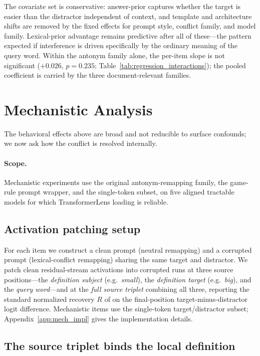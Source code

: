 \documentclass[11pt]{article}
\begin{document}
The covariate set is conservative: answer-prior captures whether the target is easier than the
distractor independent of context, and template and architecture shifts are removed by the
fixed effects for prompt style, conflict family, and model family. Lexical-prior advantage remains predictive after all of these---the pattern expected if
interference is driven specifically by the ordinary meaning of the query word. Within the
antonym family alone, the per-item slope is not significant
($+0.026$, $p=0.235$; Table~\ref{tab:regression_interactions}); the pooled coefficient is
carried by the three document-relevant families.


\section{Mechanistic Analysis}
\label{sec:mechanism}

The behavioral effects above are broad and not reducible to surface confounds; we now ask
how the conflict is resolved internally.

\paragraph{Scope.}
Mechanistic experiments use the original antonym-remapping family, the game-rule prompt
wrapper, and the single-token subset, on five aligned tractable models for which
TransformerLens loading is reliable.

\subsection{Activation patching setup}

For each item we construct a clean prompt (neutral remapping) and a corrupted prompt
(lexical-conflict remapping) sharing the same target and distractor. We patch clean
residual-stream activations into corrupted runs at three source positions---the
\emph{definition subject} (e.g.\ \emph{small}), the \emph{definition target}
(e.g.\ \emph{big}), and the \emph{query word}---and at the \emph{full source triplet}
combining all three, reporting the standard normalized recovery $R$ of
\citet{zhang2024towards} on the final-position target-minus-distractor logit difference.
Mechanistic items use the single-token target/distractor subset; Appendix~\ref{app:mech_impl}
gives the implementation details.

\subsection{The source triplet binds the local definition}
\end{document}
